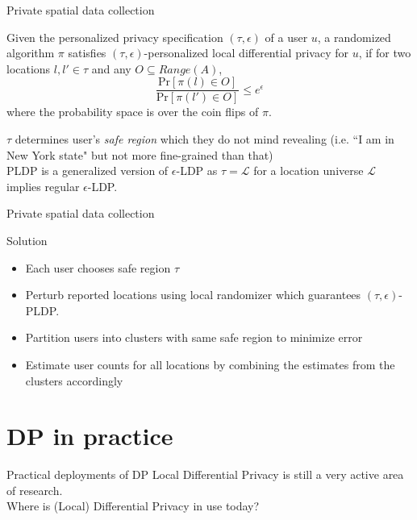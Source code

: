 \documentclass[aspectratio=43]{beamer}
\begin{document}
\begin{frame}{Private spatial data collection}
    \begin{definition}
        Given the personalized privacy specification $(\tau,\epsilon)$ of a user $u$, a randomized algorithm $\pi$ satisfies $(\tau,\epsilon)$-personalized local differential privacy for $u$, if for two locations $l, l' \in \tau$ and any $O \subseteq Range(A)$,
        $$
        \frac{\text{Pr}[\pi(l) \in O]}{\text{Pr}[\pi(l') \in O]} \leq e^{\epsilon}
        $$
        where the probability space is over the coin flips of $\pi$.
    \end{definition}
    \bigskip
    $\tau$ determines user's \emph{safe region} which they do not mind revealing (i.e. ``I am in New York state" but not more fine-grained than that)\\
    \bigskip
    PLDP is a generalized version of $\epsilon$-LDP as $\tau = \mathcal{L}$ for a location universe $\mathcal{L}$ implies regular $\epsilon$-LDP.
\end{frame}


\begin{frame}{Private spatial data collection}
    \begin{exampleblock}{Solution}
    \begin{itemize}
        \item Each user chooses safe region $\tau$
        \item Perturb reported locations using local randomizer which guarantees $(\tau,\epsilon)$-PLDP.
        \item Partition users into clusters with same safe region to minimize error
        \item Estimate user counts for all locations by combining the estimates from the clusters accordingly
    \end{itemize}
    \end{exampleblock}
\end{frame}


\section{DP in practice}

\begin{frame}{Practical deployments of DP}
    \centering
    Local Differential Privacy is still a very active area of research.\\
    \bigskip
    Where is (Local) Differential Privacy in use today?
\end{frame}
\end{document}
